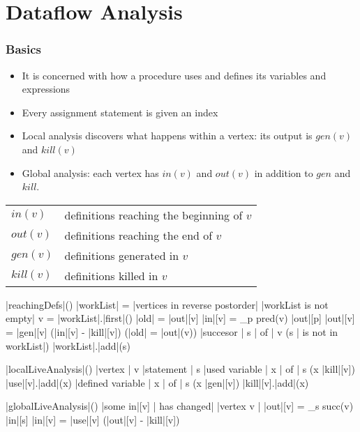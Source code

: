 \documentclass[a4paper,12pt, notitlepage]{article}
\newcommand{\negv}{\vspace{-0.7cm}}
\begin{document}
\section*{Dataflow Analysis}
\subsubsection*{Basics}
\begin{itemize}
\item It is concerned with how a procedure uses and defines its variables and 
expressions
\item Every assignment statement is given an index
\item Local analysis discovers what happens within a vertex: its output is
$gen(v)$ and $kill(v)$
\item Global analysis: each vertex has $in(v)$ and $out(v)$ in addition to $gen$
and $kill$.
\end{itemize}
\begin{tabular}{ll}
$in(v)$ & definitions reaching the beginning of $v$ \\
$out(v)$ & definitions reaching the end of $v$ \\
$gen(v)$ & definitions generated in $v$ \\
$kill(v)$ & definitions killed in $v$ \\
\end{tabular}

\begin{program}
\PROC |reachingDefs|() \BODY
    |workList| = |vertices in reverse postorder|
    \WHILE |workList is not empty| \DO
        v = |workList|.|first|()
        |old| = |out|[v]
        |in|[v] = \displaystyle \bigcup_{p \in pred(v)} |out|[p]
        |out|[v] = |gen|[v] \cup (|in|[v] - |kill|[v])
        \IF (|old| \not= |out|(v)) \AR*
            \FOREACH |succesor | s | of | v \DO
                \IF (s | is not in workList|) \AR* 
                    |workList|.|add|(s)
                \FI
            \OD
        \FI
    \OD
\end{program}
\negv
\begin{program}
\PROC |localLiveAnalysis|() \BODY
    \FOREACH |vertex | v \DO
        \FOREACH |statement | s \DO
            \FOREACH |used variable | x | of | s \DO
                \IF (x \not\in |kill|[v]) \AR*
                   |use|[v].|add|(x)
                \FI
            \OD
            \FOREACH |defined variable | x | of | s \DO
                \IF (x \not\in |gen|[v]) \AR*
                   |kill|[v].|add|(x)
                \FI
            \OD
        \OD
    \OD
\end{program}
\negv
\begin{program}
\PROC |globalLiveAnalysis|() \BODY
    \WHILE |some in|[v] | has changed| \DO
        \FOREACH |vertex v | \DO
            |out|[v] = \displaystyle \bigcup_{s \in succ(v)} |in|[s]
            |in|[v] = |use|[v] \cup (|out|[v] - |kill|[v])
        \OD
    \OD
\end{program}
\end{document}
